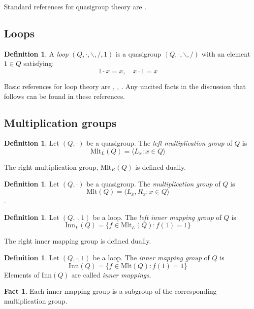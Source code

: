 \documentclass[12pt]{report}
\theoremstyle{definition}
\newtheorem{fct}[thm]{Fact}
\newtheorem{dfn}[thm]{Definition}
\newcommand{\ldv}{\backslash}       %
\newcommand{\rdv}{/}                %
\newcommand{\mlt}{\text{Mlt}}       %
\newcommand{\inn}{\text{Inn}}       %
\begin{document}
Standard references for quasigroup theory are \cite{Belousov,Bruck,Pf,Shcherbacov,Smith}.

\subsection{Loops}

\begin{dfn}
  A \emph{loop} $(Q, \cdot, \ldv, \rdv, 1)$ is a quasigroup $(Q, \cdot, \ldv, \rdv)$ with an element $1\in Q$ satisfying:
  \[1\cdot x = x, \quad x\cdot 1 = x\]
\end{dfn}

Basic references for loop theory are \cite{Bel}, \cite{Bruck}, \cite{Pf}. Any uncited facts in the discussion that follows
  can be found in these references.

\subsection{Multiplication groups}

\begin{dfn}
  Let $(Q, \cdot)$ be a quasigroup. The \emph{left multiplication group} of $Q$ is
  \[\mlt_L(Q) = \langle L_x : x\in Q\rangle\]
\end{dfn}

The right multiplication group, $\mlt_R(Q)$ is defined dually.

\begin{dfn}
  Let $(Q, \cdot)$ be a quasigroup. The \emph{multiplication group} of $Q$ is
  \[\mlt(Q) = \langle L_x, R_x : x\in Q\rangle\].
\end{dfn}

\begin{dfn}
  Let $(Q, \cdot, 1)$ be a loop. The \emph{left inner mapping group} of $Q$ is
  \[\inn_L(Q) = \{f\in \mlt_L(Q) : f(1) = 1\}\]
\end{dfn}

The right inner mapping group is defined dually.

\begin{dfn}
  Let $(Q, \cdot, 1)$ be a loop. The \emph{inner mapping group} of $Q$ is
  \[\inn(Q) = \{f\in\mlt(Q) : f(1) = 1\}\]
  Elements of $\inn(Q)$ are called \emph{inner mappings}.
\end{dfn}

\begin{fct}
  Each inner mapping group is a subgroup of the corresponding multiplication group.
\end{fct}
\end{document}
